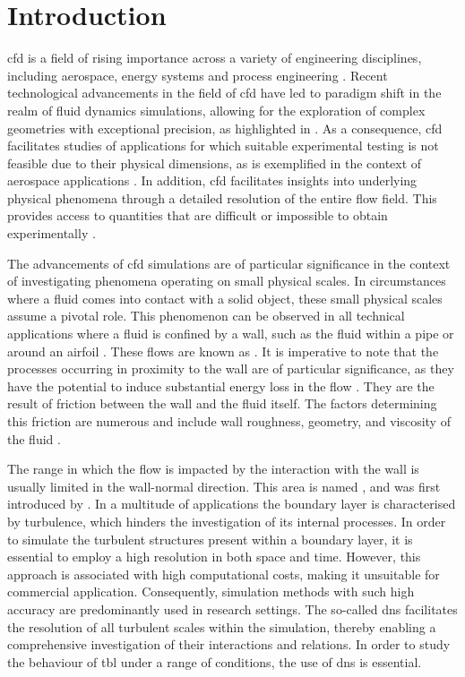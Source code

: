 \chapter{Introduction}
\label{chap:introduction}

\Acrfull{cfd} is a field of rising importance across a variety of engineering disciplines, including  aerospace, energy systems and process engineering \citep{versteeg_introduction_2007}.
Recent technological advancements in the field of \acrshort{cfd} have led to paradigm shift in the realm of fluid dynamics simulations, allowing for the exploration of complex geometries with exceptional precision, as highlighted in \citep{slotnick_cfd_2014}.
As a consequence, \acrshort{cfd} facilitates studies of applications for which suitable experimental testing is not feasible due to their physical dimensions, as is exemplified in the context of aerospace applications \citep{slotnick_cfd_2014}.
In addition, \acrshort{cfd} facilitates insights into underlying physical phenomena through a detailed resolution of the entire flow field. This provides access to quantities that are difficult or impossible to obtain experimentally \citep{versteeg_introduction_2007}.

The advancements of \acrshort{cfd} simulations are of particular significance in the context of investigating phenomena operating on small physical scales.
In circumstances where a fluid comes into contact with a solid object, these small physical scales assume a pivotal role.
This phenomenon can be observed in all technical applications where a fluid is confined by a wall, such as the fluid within a pipe or around an airfoil \citep{marusic_wall-bounded_2010}.
These flows are known as .
It is imperative to note that the processes occurring in proximity to the wall are of particular significance, as they have the potential to induce substantial energy loss in the flow \citep{fan_decomposition_2020}.
They are the result of friction between the wall and the fluid itself.
The factors determining this friction are numerous and include wall roughness, geometry, and viscosity of the fluid \citep{schlichting_boundary-layer_2017}.


The range in which the flow is impacted by the interaction with the wall is usually limited in the wall-normal direction.
This area is named , and was first introduced by \citet{prandtl_uber_1904}.
In a multitude of applications the boundary layer is characterised by turbulence, which hinders the investigation of its internal processes.
In order to simulate the turbulent structures present within a boundary layer, it is essential to employ a high resolution in both space and time.
However, this approach is associated with high computational costs, making it unsuitable for commercial application.
Consequently, simulation methods with such high accuracy are predominantly used in research settings.
The so-called \acrfull{dns} facilitates the resolution of all turbulent scales within the simulation, thereby enabling a comprehensive investigation of their interactions and relations.
In order to study the behaviour of \acrfull{tbl} under a range of conditions, the use of \acrshort{dns} is essential. \\


